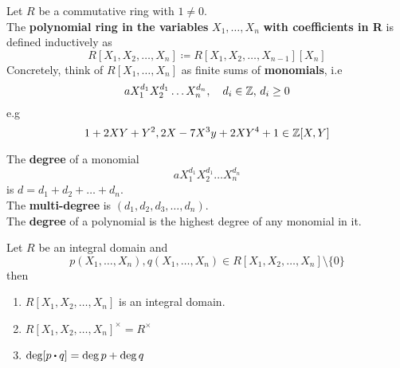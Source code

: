 \documentclass[../Main.tex]{subfiles}
\begin{document}
\begin{dfn}[title = Multivariable Polynoimal Ring]
	Let $R$ be a commutative ring with $1\ne 0$. \\
	The \textbf{polynomial ring in the variables }$X_1,\dots,X_n$ \textbf{with coefficients in R} is defined inductively as
	\[R[X_1,X_2,\dots,X_n]\coloneqq R[X_1,X_2,\dots,X_{n-1}][X_n]\]
	Concretely, think of $R[X_1,\dots,X_n]$ as finite sums of \textbf{monomials}, i.e 
	\[aX_1^{d_1}X_2^{d_1}\dots X_n^{d_n},\quad d_i\in \mathbb{Z}, \, d_i\ge 0\]
	e.g
	\[1+2XY+Y^2,2X-7X^3y+2XY^4+1\in \mathbb{Z}[X,Y]\]
\end{dfn}
\begin{dfn}[title = {Multi-Degree}]
	The \textbf{degree} of a monomial
	\[aX_1^{d_1}X_2^{d_1}\dots X_n^{d_n}\]
	is $d=d_1+d_2+\dots+d_n$.\\
	The \textbf{multi-degree} is $(d_1,d_2,d_3,\dots,d_n)$.\\
	The \textbf{degree} of a polynomial is the highest degree of any monomial in it.
\end{dfn}
\begin{prop}
	Let $R$ be an integral domain and
	\[p(X_1,\dots,X_n),q(X_1,\dots,X_n)\in R[X_1,X_2,\dots,X_n]\setminus\{0\}\] then
	\begin{enumerate}[label=(\arabic*)]
		\item $R[X_1,X_2,\dots,X_n]$ is an integral domain.
		\item $R[X_1,X_2,\dots,X_n]^\times = R^\times$
		\item $\deg[p\rdot q]=\deg p+\deg q$
	\end{enumerate}
\end{prop}
\end{document}

